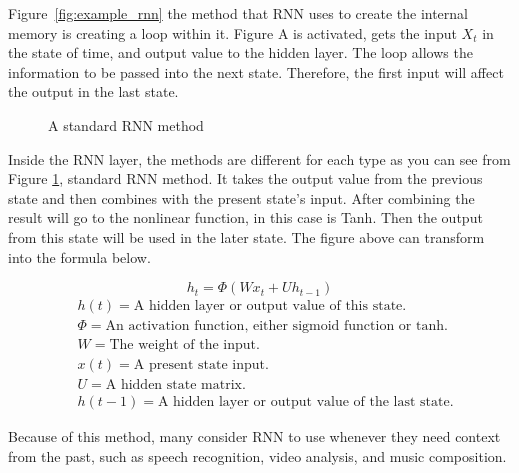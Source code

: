 \documentclass[12pt,oneside,openright,a4paper]{cpe-english-project}
\begin{document}
Figure~\ref*{fig:example_rnn} the method that RNN uses to create the internal memory is
creating a loop within it. Figure A is activated, gets the input $X_t$ in the state of time,
and output value to the hidden layer. The loop allows the information to be passed into the
next state. Therefore, the first input will affect the output in the last state.

\begin{figure}[!h] \centering
  \setlength{\fboxrule}{0.2mm} %
  \setlength{\fboxsep}{0.5cm} %
  \caption{A standard RNN method} %
  \label{fig:standard_rnn} %
\end{figure}

Inside the RNN layer, the methods are different for each type as you can see from Figure
\ref*{fig:standard_rnn}, standard RNN method. It takes the output value from the previous
state and then combines with the present state’s input. After combining the result will go
to the nonlinear function, in this case is Tanh. Then the output from this state will be
used in the later state. The figure above can transform into the formula below.

\[h_t = \Phi(Wx_t + Uh_{t-1})\]
\begin{align*}
&h(t) = \text{A hidden layer or output value of this state.}\\
&\Phi = \text{An activation function, either sigmoid function or tanh.}\\
&W = \text{The weight of the input.}\\
&x(t) = \text{A present state input.}\\
&U = \text{A hidden state matrix.}\\
&h(t-1) = \text{A hidden layer or output value of the last state.}
\end{align*}

Because of this method, many consider RNN to use whenever they need context from the past,
such as speech recognition, video analysis, and music composition.
\end{document}
